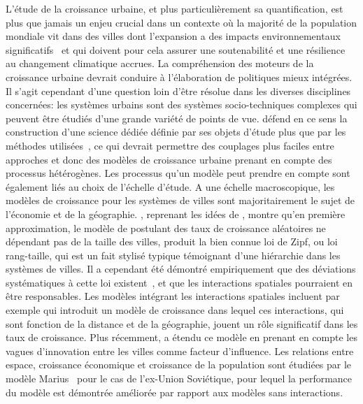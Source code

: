 {L'étude de la croissance urbaine, et plus particulièrement sa quantification, est plus que jamais un enjeu crucial dans un contexte où la majorité de la population mondiale vit dans des villes dont l'expansion a des impacts environnementaux significatifs~\cite{seto2012global} et qui doivent pour cela assurer une soutenabilité et une résilience au changement climatique accrues. La compréhension des moteurs de la croissance urbaine devrait conduire à l'élaboration de politiques mieux intégrées. Il s'agit cependant d'une question loin d'être résolue dans les diverses disciplines concernées: les systèmes urbains sont des systèmes socio-techniques complexes qui peuvent être étudiés d'une grande variété de points de vue.  défend en ce sens la construction d'une science dédiée définie par ses objets d'étude plus que par les méthodes utilisées~\cite{batty2013new}, ce qui devrait permettre des couplages plus faciles entre approches et donc des modèles de croissance urbaine prenant en compte des processus hétérogènes. Les processus qu'un modèle peut prendre en compte sont également liés au choix de l'échelle d'étude. A une échelle macroscopique, les modèles de croissance pour les systèmes de villes sont majoritairement le sujet de l'économie et de la géographie. \cite{gabaix1999zipf}, reprenant les idées de \cite{gibrat1931inegalites}, montre qu'en première approximation, le modèle de  postulant des taux de croissance aléatoires ne dépendant pas de la taille des villes, produit la bien connue loi de Zipf, ou loi rang-taille, qui est un fait stylisé typique témoignant d'une hiérarchie dans les systèmes de villes. Il a cependant été démontré empiriquement que des déviations systématiques à cette loi existent~\cite{rozenfeld2008laws}, et que les interactions spatiales pourraient en être responsables. Les modèles intégrant les interactions spatiales incluent par exemple \cite{bretagnolle2000long} qui introduit un modèle de croissance dans lequel ces interactions, qui sont fonction de la distance et de la géographie, jouent un rôle significatif dans les taux de croissance. Plus récemment, \cite{favaro2011gibrat} a étendu ce modèle en prenant en compte les vagues d'innovation entre les villes comme facteur d'influence. Les relations entre espace, croissance économique et croissance de la population sont étudiées par le modèle Marius~\cite{cottineau2014evolution} pour le cas de l'ex-Union Soviétique, pour lequel la performance du modèle est démontrée améliorée par rapport aux modèles sans interactions.
}

